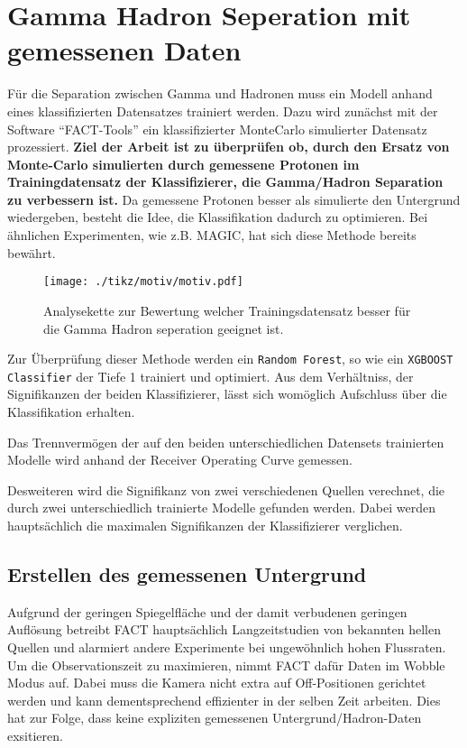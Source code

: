 \chapter{Gamma Hadron Seperation mit gemessenen Daten}
Für die Separation zwischen Gamma und Hadronen muss ein Modell anhand eines klassifizierten Datensatzes trainiert werden.
Dazu wird zunächst mit der Software ``FACT-Tools'' ein klassifizierter MonteCarlo simulierter Datensatz prozessiert.
\textbf{Ziel der Arbeit ist zu überprüfen ob, durch den Ersatz von Monte-Carlo simulierten durch gemessene Protonen im Trainingdatensatz der Klassifizierer, die Gamma/Hadron Separation zu verbessern ist.}
Da gemessene Protonen besser als simulierte den Untergrund wiedergeben, besteht die Idee, die Klassifikation dadurch zu optimieren.
Bei ähnlichen Experimenten, wie z.B. MAGIC, hat sich diese Methode bereits bewährt. 
\begin{figure}[H]
  \centering
  \texttt{[image: ./tikz/motiv/motiv.pdf]}
  \caption{Analysekette zur Bewertung welcher Trainingsdatensatz besser für die Gamma Hadron seperation geeignet ist.}
\end{figure}
Zur Überprüfung dieser Methode werden ein \texttt{Random Forest}, so wie ein \texttt{XGBOOST Classifier} der Tiefe 1 trainiert und optimiert.
Aus dem Verhältniss, der Signifikanzen der beiden Klassifizierer, lässt sich womöglich Aufschluss über die Klassifikation erhalten.

Das Trennvermögen der auf den beiden unterschiedlichen Datensets trainierten Modelle wird anhand der Receiver Operating Curve gemessen.

Desweiteren wird die Signifikanz von zwei verschiedenen Quellen verechnet, die durch zwei unterschiedlich trainierte Modelle gefunden werden. 
Dabei werden hauptsächlich die maximalen Signifikanzen der Klassifizierer verglichen.
\section{Erstellen des gemessenen Untergrund}
Aufgrund der geringen Spiegelfläche und der damit verbudenen geringen Auflösung betreibt FACT hauptsächlich Langzeitstudien von bekannten hellen Quellen und alarmiert andere Experimente bei ungewöhnlich hohen Flussraten.
Um die Observationszeit zu maximieren, nimmt FACT dafür Daten im Wobble Modus auf. 
Dabei muss die Kamera nicht extra auf Off-Positionen gerichtet werden und kann dementsprechend effizienter in der selben Zeit arbeiten. 
Dies hat zur Folge, dass keine expliziten gemessenen Untergrund/Hadron-Daten exsitieren. 

